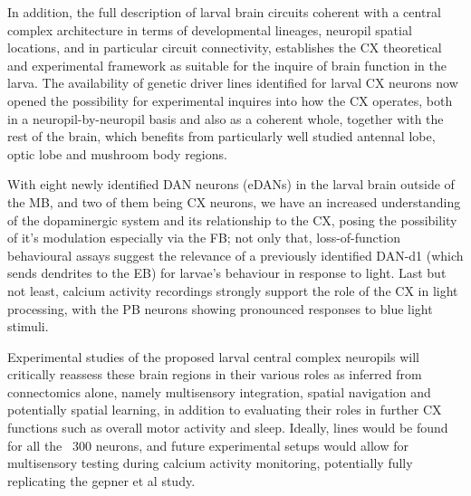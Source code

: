 In addition, the full description of larval brain circuits coherent with a central complex architecture in terms of developmental lineages, neuropil spatial locations, and in particular circuit connectivity, establishes the CX theoretical and experimental framework as suitable for the inquire of brain function in the larva. The availability of genetic driver lines identified for larval CX neurons now opened the possibility for experimental inquires into how the CX operates, both in a neuropil-by-neuropil basis and also as a coherent whole, together with the rest of the brain, which benefits from particularly well studied antennal lobe, optic lobe and mushroom body regions. 

With eight newly identified DAN neurons (eDANs) in the larval brain outside of the MB, and two of them being CX neurons, we have an increased understanding of the dopaminergic system and its relationship to the CX, posing the possibility of it's modulation especially via the FB; not only that, loss-of-function behavioural assays suggest the relevance of a previously identified DAN-d1 (which sends dendrites to the EB) for larvae's behaviour in response to light. Last but not least, calcium activity recordings strongly support the role of the CX in light processing, with the PB neurons showing pronounced responses to blue light stimuli. 

Experimental studies of the proposed larval central complex neuropils will critically reassess these brain regions in their various roles as inferred from connectomics alone, namely multisensory integration, spatial navigation and potentially spatial learning, in addition to evaluating their roles in further CX functions such as overall motor activity and sleep. Ideally, lines would be found for all the ~300 neurons,  and future experimental setups would allow for multisensory testing during calcium activity monitoring, potentially fully replicating the gepner et al study. 









